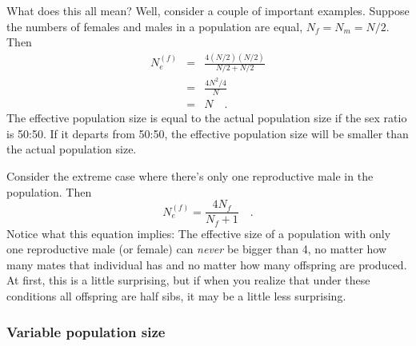 What does this all mean? Well, consider a couple of important
examples. Suppose the numbers of females and males in a population are
equal, $N_f = N_m = N/2$. Then
\begin{eqnarray*}
N_e^{(f)} &=& \frac{4(N/2)(N/2)}{N/2 + N/2} \\
          &=& \frac{4N^2/4}{N} \\
          &=& N \quad .
\end{eqnarray*}
The effective population size is equal to the actual population size
if the sex ratio is 50:50. If it departs from 50:50, the effective
population size will be smaller than the actual population
size.

Consider the extreme case where there's only one reproductive
male in the population. Then
\begin{equation}
N_e^{(f)} = \frac{4N_f}{N_f + 1} \quad . \label{eq:ne-harem}
\end{equation}
Notice what this equation implies: The effective size of a population
with only one reproductive male (or female) can {\it never\/} be
bigger than 4, no matter how many mates that individual has and no
matter how many offspring are produced. At first, this is a little
surprising, but if when you realize that under these conditions all
offspring are half sibs, it may be a little less surprising.

\subsubsection*{Variable population size}

